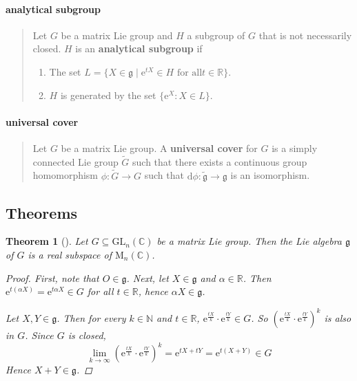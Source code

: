 \documentclass[letterpaper, 10pt]{article}
\theoremstyle{theostyle}
\newtheorem{theorem}{Theorem}[section]
\newenvironment{thmstyle}[1][]{%
    \begin{theorem}[#1]\leavevmode\vspace{-\baselineskip}\myquote%
    }{\endmyquote\end{theorem}}
\begin{document}
\paragraph{analytical subgroup}
\begin{quote}
    Let \(G\) be a matrix Lie group and \(H\) a subgroup of \(G\) that is not necessarily closed.
    \(H\) is an \textbf{analytical subgroup} if
    \begin{enumerate}
        \item The set \(L = \{X \in \mathfrak{g} \mid \mathrm{e}^{tX} \in H \text{ for all} t \in \mathbb{R}\}\).
        \item \(H\) is generated by the set \(\{\mathrm{e}^X : X \in L \}\).
    \end{enumerate}
\end{quote}

\paragraph{universal cover}
\begin{quote}
    Let \(G\) be a matrix Lie group.
    A \textbf{universal cover} for \(G\) is a simply connected Lie group \(\tilde{G}\) such that there exists a continuous group homomorphism \(\phi: \tilde{G} \rightarrow G\) such that
    \(\mathrm{d}\phi: \tilde{\mathfrak{g}} \rightarrow \mathfrak{g}\) is an isomorphism.
\end{quote}

\subsection{Theorems}

\begin{thmstyle}
    Let \(G \subseteq \mathrm{GL}_n (\mathbb{C})\) be a matrix Lie group.
    Then the Lie algebra \(\mathfrak{g}\) of \(G\) is a real subspace of \(\mathrm{M}_n(\mathbb{C})\).

    \begin{proof}
        First, note that \(O \in \mathfrak{g}\).
        Next, let \(X \in \mathfrak{g}\) and \(\alpha \in \mathbb{R}\).
        Then \(\mathrm{e}^{t(\alpha X)} = \mathrm{e}^{t\alpha X} \in G\) for all \(t \in \mathbb{R}\), hence \(\alpha X \in \mathfrak{g}\).

        Let \(X,Y\in \mathfrak{g}\).
        Then for every \(k \in \mathbb{N}\) and \(t \in \mathbb{R}\), \(\mathrm{e}^{\frac{tX}{k}} \cdot \mathrm{e}^{\frac{tY}{k}} \in G\).
        So \(\left( \mathrm{e}^{\frac{tX}{k}} \cdot \mathrm{e}^{\frac{tY}{k}} \right)^k\) is also in \(G\).
        Since \(G\) is closed,
        \[\lim_{k \to \infty} \left( \mathrm{e}^{\frac{tX}{k}} \cdot \mathrm{e}^{\frac{tY}{k}} \right)^k = \mathrm{e}^{tX + tY} = \mathrm{e}^{t(X+Y)} \in G\]
        Hence \(X + Y \in \mathfrak{g}\).
    \end{proof}
\end{thmstyle}
\end{document}
